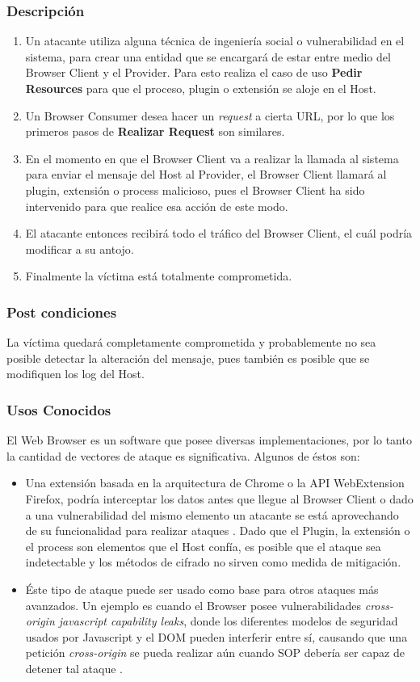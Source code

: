 	\subsubsection{Descripción}
			\begin{enumerate}
				\item Un atacante utiliza alguna técnica de ingeniería social o vulnerabilidad en el sistema, para crear una entidad que se encargará de estar entre medio del Browser Client y el Provider. Para esto realiza el caso de uso \textbf{Pedir Resources} para que el proceso, plugin o extensión se aloje en el Host.
				\item Un Browser Consumer desea hacer un \textit{request} a cierta URL, por lo que los primeros pasos de \textbf{Realizar Request} son similares.
				\item En el momento en que el Browser Client va a realizar la llamada al sistema para enviar el mensaje del Host al Provider, el Browser Client llamará al plugin, extensión o process malicioso, pues el Browser Client ha sido intervenido para que realice esa acción de este modo.
				\item El atacante entonces recibirá todo el tráfico del Browser Client, el cuál podría modificar a su antojo.
				\item Finalmente la víctima está totalmente comprometida.
			\end{enumerate}
	\subsubsection{Post condiciones} La víctima quedará completamente comprometida y probablemente no sea posible detectar la alteración del mensaje, pues también es posible que se modifiquen los log del Host.
	\subsubsection{Usos Conocidos} El Web Browser es un software que posee diversas implementaciones, por lo tanto la cantidad de vectores de ataque es significativa. Algunos de éstos son:
			\begin{itemize}
				\item  Una extensión basada en la arquitectura de Chrome o la API WebExtension Firefox, podría interceptar los datos antes que llegue al Browser Client \cite{Paola2006} o dado a una vulnerabilidad del mismo elemento un atacante se está aprovechando de su funcionalidad para realizar ataques \cite{Liu2012, Barth2010}. Dado que el Plugin, la extensión o el process son elementos que el Host confía, es posible que el ataque sea indetectable y los métodos de cifrado no sirven como medida de mitigación.
				\item Éste tipo de ataque puede ser usado como base para otros ataques más avanzados. Un ejemplo es cuando el Browser posee vulnerabilidades \textit{cross-origin javascript capability leaks}, donde los diferentes modelos de seguridad usados por Javascript y el DOM pueden interferir entre sí, causando que una petición \textit{cross-origin} se pueda realizar aún cuando SOP debería ser capaz de detener tal ataque \cite{Barth2009}.
			\end{itemize}


